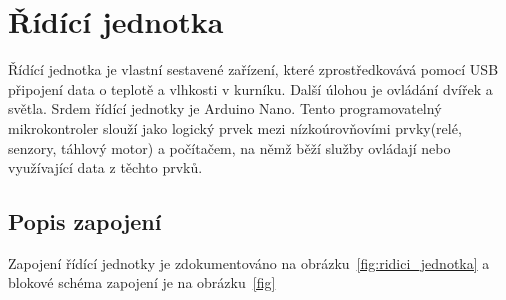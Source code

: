 \section{Řídící jednotka}\label{sec:ridici-jednotka}
Řídící jednotka je vlastní sestavené zařízení, které zprostředkovává pomocí USB připojení data o teplotě a vlhkosti v kurníku.
Další úlohou je ovládání dvířek a světla.
Srdem řídící jednotky je Arduino Nano.
Tento programovatelný mikrokontroler slouží jako logický prvek mezi nízkoúrovňovími prvky(relé, senzory, táhlový motor) a počítačem, na němž běží služby ovládají nebo využívající data z těchto prvků.

\subsection*{Popis zapojení}
Zapojení řídící jednotky je zdokumentováno na obrázku~\ref{fig:ridici_jednotka} a blokové schéma zapojení je na obrázku~\ref{fig}

